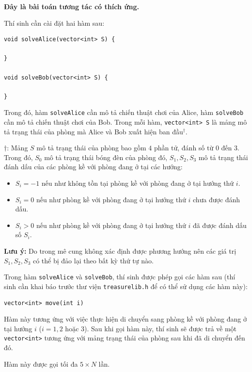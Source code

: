 \textbf{Đây là bài toán tương tác có thích ứng.}

Thí sinh cần cài đặt hai hàm sau:

\begin{lstlisting}
void solveAlice(vector<int> S) {

}

void solveBob(vector<int> S) {

}
\end{lstlisting}

Trong đó, hàm \texttt{solveAlice} cần mô tả chiến thuật chơi của Alice, hàm \texttt{solveBob} cần mô tả chiến thuật chơi của Bob. Trong mỗi hàm, \texttt{vector<int> S} là mảng mô tả trạng thái của phòng mà Alice và Bob xuất hiện ban đầu$^{\dagger}$.

$\dagger$: Mảng $S$ mô tả trạng thái của phòng bao gồm $4$ phần tử, đánh số từ $0$ đến $3$. Trong đó, $S_0$ mô tả trạng thái bóng đèn của phòng đó, $S_1,S_2,S_3$ mô tả trạng thái đánh dấu của các phòng kề với phòng đang ở tại các hướng:
\begin{itemize}
  \item $S_i=-1$ nếu như không tồn tại phòng kề với phòng đang ở tại hướng thứ $i$.
  \item $S_i=0$ nếu như phòng kề với phòng đang ở tại hướng thứ $i$ chưa được đánh dấu.
  \item $S_i>0$ nếu như phòng kề với phòng đang ở tại hướng thứ $i$ đã được đánh dấu số $S_i$.
\end{itemize}

\textbf{Lưu ý:} Do trong mê cung không xác định được phương hướng nên các giá trị $S_1,S_2,S_3$ có thể bị đảo lại theo bất kỳ thứ tự nào.

Trong hàm \texttt{solveAlice} và \texttt{solveBob}, thí sinh được phép gọi các hàm sau (thí sinh cần khai báo trước thư viện \texttt{treasurelib.h} để có thể sử dụng các hàm này):
\begin{center}
\begin{lstlisting}
vector<int> move(int i)
\end{lstlisting}
\end{center}

Hàm này tương ứng với việc thực hiện di chuyển sang phòng kề với phòng đang ở tại hướng $i$ ($i=1,2$ hoặc $3$). Sau khi gọi hàm này, thí sinh sẽ được trả về một \texttt{vector<int>} tương ứng với mảng trạng thái của phòng sau khi đã di chuyển đến đó.

Hàm này được gọi tối đa $5\times N$ lần.

